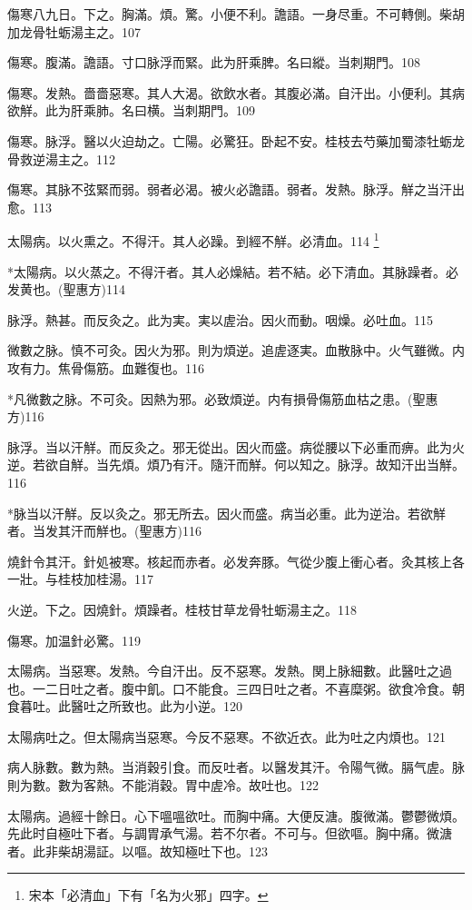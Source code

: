 \documentclass[12pt,twoside,UTF8,b5paper]{ctexbook}
\begin{document}
傷寒八九日。下之。胸滿。煩。驚。小便不利。譫語。一身尽重。不可轉側。柴胡加龙骨牡蛎湯主之。107

傷寒。腹滿。譫語。寸口脉浮而緊。此为肝乘脾。名曰縱。当刺期門。108

傷寒。发熱。嗇嗇惡寒。其人大渴。欲飲水者。其腹必滿。自汗出。小便利。其病欲觧。此为肝乘肺。名曰横。当刺期門。109

傷寒。脉浮。醫以火迫劫之。亡陽。{必}驚狂。卧起不安。桂枝去芍藥加蜀漆牡蛎龙骨救逆湯主之。112

傷寒。其脉不弦緊而弱{。弱}者必渴。被火必譫語。{弱者。发熱。脉浮。觧之当汗出愈。}113

太陽病。以火熏之。不得汗。其人必躁。到經不觧。必清血。114
	\footnote{宋本「必清血」下有「名为火邪」四字。}

*太陽病。以火蒸之。不得汗者。其人必燥結。若不結。必下清血。其脉躁者。必发黄也。(聖惠方)114

脉浮。熱甚。而反灸之。此为実。実以虗治。因火而動。咽燥。必吐血。115

微數之脉。慎不可灸。因火为邪。則为煩逆。追虗逐実。血散脉中。火气雖微。内攻有力。焦骨傷筋。血難復也。116

*凡微數之脉。不可灸。因熱为邪。必致煩逆。内有損骨傷筋血枯之患。(聖惠方)116

脉浮。当以汗觧。而反灸之。邪无從出。因火而盛。病從腰以下必重而痹。此为火逆。若欲自觧。当先煩。煩乃有汗。隨汗而觧。何以知之。脉浮。故知汗出当觧。116

*脉当以汗觧。反以灸之。邪无所去。因火而盛。病当必重。此为逆治。若欲觧者。当发其汗而觧也。(聖惠方)116

燒針令其汗。針処被寒。核起而赤者。必发奔豚。气從少腹上衝心者。灸其核上各一壯。与桂枝加桂湯。117

火逆。下之。因燒針。煩躁者。桂枝甘草龙骨牡蛎湯主之。118

傷寒。加温針必驚。119

太陽病。当惡寒。发熱。今自汗出。反不惡寒。发熱。関上脉細數。此醫吐之過也。一二日吐之者。腹中飢。口不能食。三四日吐之者。不喜糜粥。欲食冷食。朝食暮吐。此醫吐之所致也。此为小逆。120

太陽病吐之。但太陽病当惡寒。今反不惡寒。不欲近衣。此为吐之内煩也。121

病人脉數。數为熱。当消穀引食。而反吐者。以醫发其汗。令陽气微。膈气虗。脉則为數。數为客熱。不能消穀。胃中虗冷。故吐也。122

太陽病。過經十餘日。心下嗢嗢欲吐。而胸中痛。大便反溏。腹微滿。鬱鬱微煩。先{此}时自極吐下者。与{調胃}承气湯。若不尔者。不可与。但欲嘔。胸中痛。微溏者。此非柴胡湯証。以嘔。故知極吐下也。123
\end{document}
